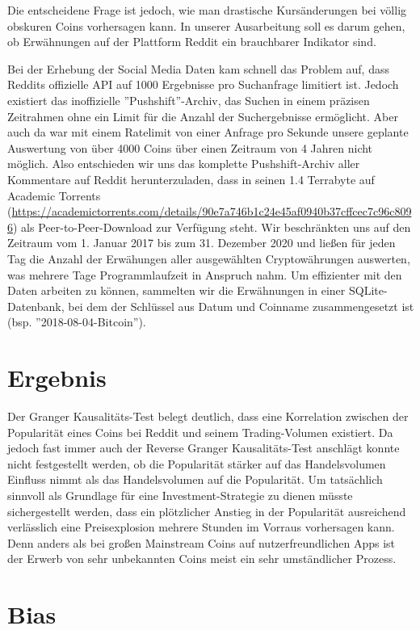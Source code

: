\documentclass[12pt]{article}
\begin{document}
Die entscheidene Frage ist jedoch, wie man drastische Kursänderungen bei völlig obskuren Coins vorhersagen kann. In unserer Ausarbeitung soll es darum gehen, ob Erwähnungen auf der Plattform Reddit ein brauchbarer Indikator sind.

Bei der Erhebung der Social Media Daten kam schnell das Problem auf, dass Reddits offizielle API auf 1000 Ergebnisse pro Suchanfrage limitiert ist. Jedoch existiert das inoffizielle ''Pushshift''-Archiv, das Suchen in einem präzisen Zeitrahmen ohne ein Limit für die Anzahl der Suchergebnisse ermöglicht. Aber auch da war mit einem Ratelimit von einer Anfrage pro Sekunde unsere geplante Auswertung von über 4000 Coins über einen Zeitraum von 4 Jahren nicht möglich. Also entschieden wir uns das komplette Pushshift-Archiv aller Kommentare auf Reddit herunterzuladen, dass in seinen 1.4 Terrabyte auf Academic Torrents (\url{https://academictorrents.com/details/90e7a746b1c24e45af0940b37cffcec7c96c8096}) als Peer-to-Peer-Download zur Verfügung steht. Wir beschränkten uns auf den Zeitraum vom 1. Januar 2017 bis zum 31. Dezember 2020 und ließen für jeden Tag die Anzahl der Erwähungen aller ausgewählten Cryptowährungen auswerten, was mehrere Tage Programmlaufzeit in Anspruch nahm. Um effizienter mit den Daten arbeiten zu können, sammelten wir die Erwähnungen in einer SQLite-Datenbank, bei dem der Schlüssel aus Datum und Coinname zusammengesetzt ist (bsp. ''2018-08-04-Bitcoin'').

\section*{Ergebnis}

Der Granger Kausalitäts-Test belegt deutlich, dass eine Korrelation zwischen der Popularität eines Coins bei Reddit und seinem Trading-Volumen existiert. Da jedoch fast immer auch der Reverse Granger Kausalitäts-Test anschlägt konnte nicht festgestellt werden, ob die Popularität stärker auf das Handelsvolumen Einfluss nimmt als das Handelsvolumen auf die Popularität. Um tatsächlich sinnvoll als Grundlage für eine Investment-Strategie zu dienen müsste sichergestellt werden, dass ein plötzlicher Anstieg in der Popularität ausreichend verlässlich eine Preisexplosion mehrere Stunden im Vorraus vorhersagen kann. Denn anders als bei großen Mainstream Coins auf nutzerfreundlichen Apps ist der Erwerb von sehr unbekannten Coins meist ein sehr umständlicher Prozess.

\section*{Bias}
\end{document}
